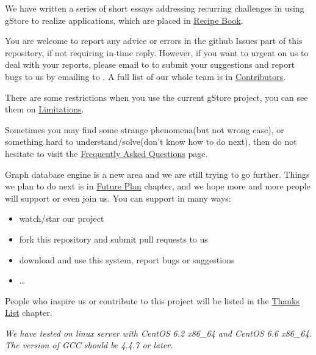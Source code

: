 \documentclass[titlepage, a4paper, 12pt]{article}
\begin{document}

We have written a series of short essays addressing recurring challenges in using gStore to realize applications, which are placed in
\hyperref[chapter12]{Recipe Book}.

You are welcome to report any advice or errors in the github Issues part of this repository, if not requiring in-time reply. However, if you want to urgent on us to deal with your reports, please email to to submit your suggestions and report bugs to us by emailing to . A full list of our whole team is in \hyperref[chapter13]{Contributors}.

There are some restrictions when you use the current gStore project, you can see them on \hyperref[chapter10]{Limitations}.

Sometimes you may find some strange phenomena(but not wrong case), or something hard to understand/solve(don't know how to do next), then do not hesitate to visit the \hyperref[chapter11]{Frequently Asked Questions} page.

Graph database engine is a new area and we are still trying to go further. Things we plan to do next is in \hyperref[chapter16]{Future Plan} chapter, and we hope more and more people will support or even
join us. You can support in many ways:

\begin{itemize}
\item
  watch/star our project
\item
  fork this repository and submit pull requests to us
\item
  download and use this system, report bugs or suggestions
\item
  \ldots{}
\end{itemize}

People who inspire us or contribute to this project will be listed in the \hyperref[chapter17]{Thanks List} chapter.

\clearpage


\emph{We have tested on linux server with CentOS 6.2 x86\_64 and CentOS 6.6 x86\_64. The version of GCC should be 4.4.7 or later.}
\end{document}
